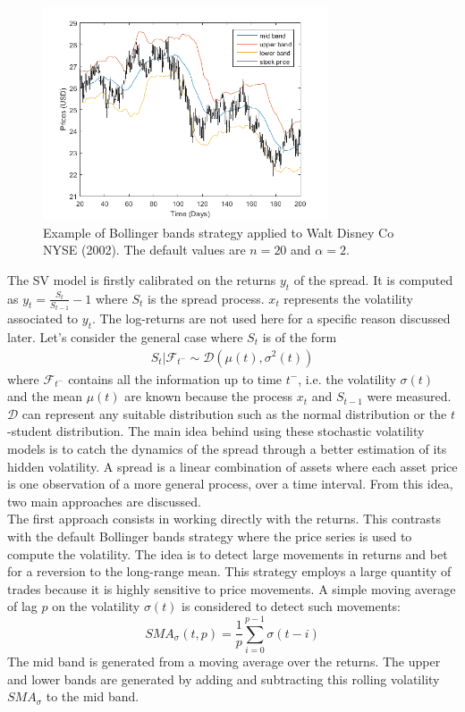 \documentclass[11pt,a4,twosided,singlespacing,titlepagenumber=on]{scrreprt}
\numberwithin{equation}{chapter} %
\theoremstyle{remark}
\begin{document}
\begin{figure}[H]
\centering
\includegraphics[width = 0.75\textwidth]{bollinger_bands_intro}
\caption{Example of Bollinger bands strategy applied to Walt Disney Co NYSE (2002). The default values are $n = 20$ and $\alpha = 2$.}
\label{bollinger_bands_intro}
\end{figure}

The SV model is firstly calibrated on the returns $y_t$ of the spread. It is computed as $y_t = \frac{S_t}{S_{t-1}}-1$ where $S_t$ is the spread process.
$x_t$ represents the volatility associated to $y_t$. The log-returns are not used here for a specific reason discussed later. Let's consider the general case where $S_t$ is of the form
\begin{align*}
S_t | \mathcal{F}_{t^-} \sim \mathcal{D}\left( \mu(t), \sigma^2(t) \right)
\end{align*}
where $\mathcal{F}_{t^-}$ contains all the information up to time $t^-$, i.e. the volatility $\sigma(t)$ and the mean $\mu(t)$ are known because the process $x_t$ and $S_{t-1}$ were measured. $\mathcal{D}$ can represent any suitable distribution such as the normal distribution or the $t$-student distribution.
The main idea behind using these stochastic volatility models is to catch the dynamics of the spread through a better estimation of its hidden volatility. A spread is a linear combination of assets where each asset price is one observation of a more general process, over a time interval. From this idea, two main approaches are discussed. \\


The first approach consists in working directly with the returns. This contrasts with the default Bollinger bands strategy where the price series is used to compute the volatility. The idea is to detect large movements in returns and bet for a reversion to the long-range mean. This strategy employs a large quantity of trades because it is highly sensitive to price movements. A simple moving average of lag $p$ on the volatility $\sigma(t)$ is considered to detect such movements:
\begin{equation}
SMA_\sigma(t, p) = \frac{1}{p} \sum_{i=0}^{p-1}\sigma(t-i)
\end{equation}
The mid band is generated from a moving average over the returns. The upper and lower bands are generated by adding and subtracting this rolling volatility $SMA_\sigma$ to the mid band. \\
\end{document}
